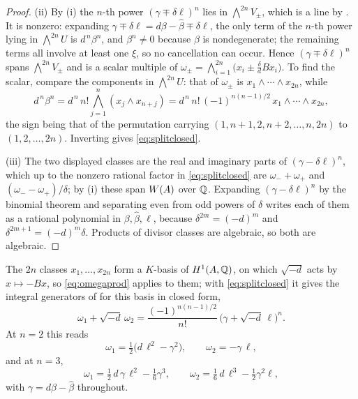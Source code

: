 \begin{proof}
(ii) By (i) the $n$-th power $(\gamma\mp\delta\ell)^{n}$ lies in
$\bigwedge^{2n}V_{\pm}$, which is a line by . It is
nonzero: expanding $\gamma\mp\delta\ell=d\beta-\widehat{\beta}\mp\delta\ell$,
the only term of the $n$-th power lying in $\bigwedge^{2n}U$ is
$d^{\,n}\beta^{n}$, and $\beta^{n}\ne0$ because $\beta$ is nondegenerate;
the remaining terms all involve at least one $\xi$, so no cancellation can
occur. Hence $(\gamma\mp\delta\ell)^{n}$ spans $\bigwedge^{2n}V_{\pm}$ and is a
scalar multiple of $\omega_{\pm}=\bigwedge_{i=1}^{2n}\bigl(x_{i}\pm\tfrac{\delta}{d}Bx_{i}\bigr)$.
To find the scalar, compare the components in $\bigwedge^{2n}U$: that of
$\omega_{\pm}$ is $x_{1}\wedge\cdots\wedge x_{2n}$, while
\[
  d^{\,n}\beta^{n}=d^{\,n}\,n!\bigwedge_{j=1}^{n}(x_{j}\wedge x_{n+j})
  =d^{\,n}\,n!\,(-1)^{n(n-1)/2}\,x_{1}\wedge\cdots\wedge x_{2n},
\]
the sign being that of the permutation carrying
$(1,n+1,2,n+2,\dots,n,2n)$ to $(1,2,\dots,2n)$. Inverting gives
\eqref{eq:splitclosed}.

(iii) The two displayed classes are the real and imaginary parts of
$(\gamma-\delta\ell)^{n}$, which up to the nonzero rational factor in
\eqref{eq:splitclosed} are $\omega_{-}+\omega_{+}$ and
$(\omega_{-}-\omega_{+})/\delta$; by (i) these span
$W(A)$ over $\mathbb{Q}$. Expanding $(\gamma-\delta\ell)^{n}$ by the binomial
theorem and separating even from odd powers of $\delta$ writes each of them as
a rational polynomial in $\beta,\widehat{\beta},\ell$, because
$\delta^{2m}=(-d)^{m}$ and $\delta^{2m+1}=(-d)^{m}\delta$. Products of divisor
classes are algebraic, so both are algebraic.
\end{proof}

\begin{example}\label{ex:splitsmall}
The $2n$ classes $x_{1},\dots,x_{2n}$ form a $K$-basis of $H^{1}(A,\mathbb{Q})$, on
which $\sqrt{-d}$ acts by $x\mapsto-Bx$, so \eqref{eq:omegaprod} applies to
them; with \eqref{eq:splitclosed} it gives the integral generators of
 for this basis in closed form,
\[
  \omega_{1}+\sqrt{-d}\,\omega_{2}
  =\frac{(-1)^{n(n-1)/2}}{n!}\,\bigl(\gamma+\sqrt{-d}\,\ell\bigr)^{n}.
\]
At $n=2$ this reads
\[
  \omega_{1}=\tfrac12\bigl(d\,\ell^{2}-\gamma^{2}\bigr),
  \qquad
  \omega_{2}=-\gamma\,\ell,
\]
and at $n=3$,
\[
  \omega_{1}=\tfrac12\,d\,\gamma\,\ell^{2}-\tfrac16\gamma^{3},
  \qquad
  \omega_{2}=\tfrac16\,d\,\ell^{3}-\tfrac12\gamma^{2}\ell,
\]
with $\gamma=d\beta-\widehat{\beta}$ throughout.
\end{example}

